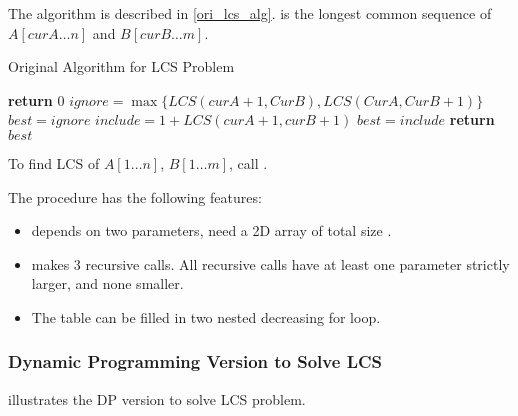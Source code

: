 The algorithm is described in \cref{ori_lcs_alg}.
 is the longest common sequence of
$A[curA \ldots n]$ and $B[curB \ldots m]$.
\begin{algorithm}[H]
\caption{Original Algorithm for LCS Problem}\label{ori_lcs_alg}
\begin{algorithmic}[1]
            \State \textbf{return} $0$
        \EndIf
        \State $ignore = \max\{LCS(curA+1, CurB), LCS(CurA, CurB+1)\}$
        \State $best = ignore$
            \State $include = 1 + LCS(curA+1, curB+1)$
                \State $best = include$
            \EndIf
        \EndIf
        \State \textbf{return} $best$
    \EndProcedure
\end{algorithmic}
\end{algorithm}

To find LCS of $A[1 \ldots n]$, $B[1 \ldots m]$, call .

\observation

The procedure  has the following features:

\begin{itemize}
    \item {} depends on two parameters,
        need a 2D array of total size .
    \item {} makes 3 recursive calls.
        All recursive calls have at least one parameter strictly
        larger, and none smaller.
    \item The table can be filled in two nested decreasing for loop.
\end{itemize}

\subsubsection{Dynamic Programming Version to Solve LCS}

illustrates the DP version to solve LCS problem.


